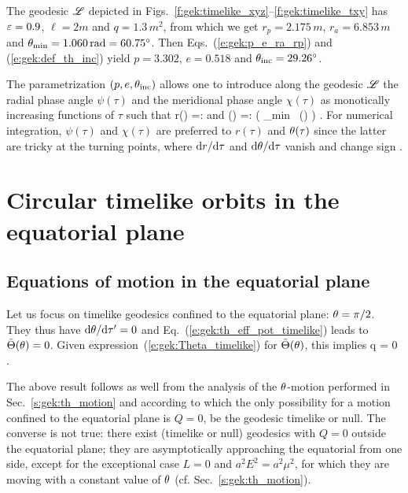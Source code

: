 \begin{example}
The geodesic $\mathscr{L}$ depicted in Figs.~\ref{f:gek:timelike_xyz}--\ref{f:gek:timelike_txy}
has $\varepsilon=0.9$, $\ell=2 m$ and $q=1.3\, m^2$, from which we get
$r_p = 2.175\, m$,
$r_a = 6.853\, m$ and $\theta_{\rm min} = 1.060\, {\rm rad} = 60.75^\circ$.
Then Eqs.~(\ref{e:gek:p_e_ra_rp}) and (\ref{e:gek:def_th_inc}) yield
$p=3.302$, $e=0.518$ and $\theta_{\rm inc} = 29.26^\circ$.
\end{example}

The parametrization $(p, e, \theta_{\rm inc})$ allows one to introduce
along the geodesic $\mathscr{L}$ the radial phase angle $\psi(\tau)$ and the
meridional phase angle $\chi(\tau)$ as monotically increasing functions
of $\tau$ such that
\be
    r(\tau) =:  \qquad\mbox{and}\qquad
    \th(\tau) =: \arccos\left( \cos\th_{\rm min} \, \cos\chi(\tau) \right) .
\ee
For numerical integration, $\psi(\tau)$ and $\chi(\tau)$ are preferred
to $r(\tau)$ and $\theta(\tau)$ since the latter are tricky at the
turning points, where $\mathrm{d} r/\mathrm{d}\tau$ and $\mathrm{d}\theta/\mathrm{d}\tau$ vanish and change sign
\cite{DrascH04}.


\section{Circular timelike orbits in the equatorial plane}

\subsection{Equations of motion in the equatorial plane}

Let us focus on timelike geodesics confined to the equatorial plane:
$\theta=\pi/2$. They thus have $\mathrm{d}\theta/\mathrm{d}\tau' = 0$ and Eq.~(\ref{e:gek:th_eff_pot_timelike})
leads to $\tilde{\Theta}(\theta) = 0$. Given expression~(\ref{e:gek:Theta_timelike}) for $\tilde{\Theta}(\theta)$, this
implies
\be
    q = 0 .
\ee
\begin{remark}
The above result follows as well from the analysis of the $\theta$-motion performed
in Sec.~\ref{s:gek:th_motion} and according to which the only possibility
for a motion confined to the equatorial plane is $Q=0$, be the geodesic timelike or null.
The converse is not true: there exist (timelike or null) geodesics with $Q=0$ outside the equatorial
plane; they are asymptotically approaching the equatorial from one side, except for
the exceptional case $L=0$ and $a^2 E^2 = a^2 \mu^2$, for which they are moving with
a constant value of $\theta$ (cf. Sec.~\ref{s:gek:th_motion}).
\end{remark}

